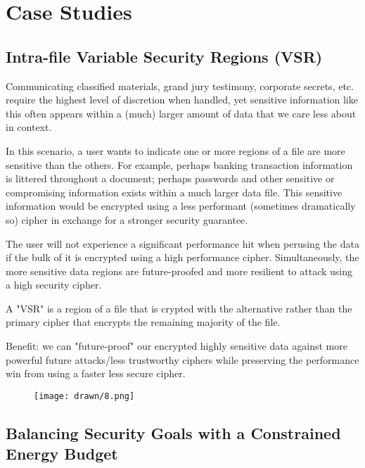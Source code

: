 \section{\SYSTEM{} Case Studies} \label{sec:usecases}

\subsection{Intra-file Variable Security Regions (VSR)}

Communicating classified materials, grand jury testimony, corporate secrets,
etc. require the highest level of discretion when handled, yet sensitive
information like this often appears within a (much) larger amount of data that
we care less about in context.

In this scenario, a user wants to indicate one or more regions of a file are
more sensitive than the others. For example, perhaps banking transaction
information is littered throughout a document; perhaps passwords and other
sensitive or compromising information exists within a much larger data file.
This sensitive information would be encrypted using a less performant (sometimes
dramatically so) cipher in exchange for a stronger security guarantee.

The user will not experience a significant performance hit when perusing the
data if the bulk of it is encrypted using a high performance cipher.
Simultaneously, the more sensitive data regions are future-proofed and more
resilient to attack using a high security cipher.

A "VSR" is a region of a file that is crypted with the alternative
rather than the primary cipher that encrypts the remaining majority of the file.

Benefit: we can "future-proof" our encrypted highly sensitive data against more
powerful future attacks/less trustworthy ciphers while preserving the
performance win from using a faster less secure cipher.

\begin{figure}[ht]
 \centering
  \texttt{[image: drawn/8.png]}
   \caption{}\label{fig:mirrored-vs-selective}
\end{figure}

\subsection{Balancing Security Goals with a Constrained Energy Budget}

